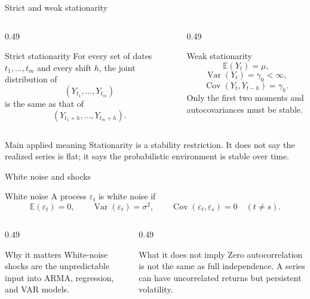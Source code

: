 \documentclass[10pt]{beamer}
\DeclareMathOperator{\Cov}{Cov}
\DeclareMathOperator{\Var}{Var}
\newcommand{\E}{\mathbb{E}}
\newcommand{\eps}{\varepsilon}
\begin{document}
\begin{frame}{Strict and weak stationarity}
\label{slide:stationarity_defs}
\small
\begin{columns}[T]
\begin{column}{0.49\textwidth}
\begin{block}{Strict stationarity}
For every set of dates $t_1,\ldots,t_m$ and every shift $h$, the joint distribution of
\[
(Y_{t_1},\ldots,Y_{t_m})
\]
is the same as that of
\[
(Y_{t_1+h},\ldots,Y_{t_m+h}).
\]
\end{block}
\end{column}
\begin{column}{0.49\textwidth}
\begin{block}{Weak stationarity}
\[
\E(Y_t)=\mu,
\]
\[
\Var(Y_t)=\gamma_0<\infty,
\]
\[
\Cov(Y_t,Y_{t-h})=\gamma_h.
\]
Only the first two moments and autocovariances must be stable.
\end{block}
\end{column}
\end{columns}

\pause
\begin{alertblock}{Main applied meaning}
Stationarity is a stability restriction. It does not say the realized series is flat; it says the probabilistic environment is stable over time.
\end{alertblock}
\end{frame}

\begin{frame}{White noise and shocks}
\label{slide:white_noise}
\small
\begin{block}{White noise}
A process $\eps_t$ is white noise if
\[
\E(\eps_t)=0,
\qquad
\Var(\eps_t)=\sigma^2,
\qquad
\Cov(\eps_t,\eps_s)=0\quad(t\neq s).
\]
\end{block}

\begin{columns}[T]
\begin{column}{0.49\textwidth}
\begin{exampleblock}{Why it matters}
White-noise shocks are the unpredictable input into ARMA, regression, and VAR models.
\end{exampleblock}
\end{column}
\begin{column}{0.49\textwidth}
\begin{alertblock}{What it does not imply}
Zero autocorrelation is not the same as full independence. A series can have uncorrelated returns but persistent volatility.
\end{alertblock}
\end{column}
\end{columns}
\end{frame}
\end{document}
